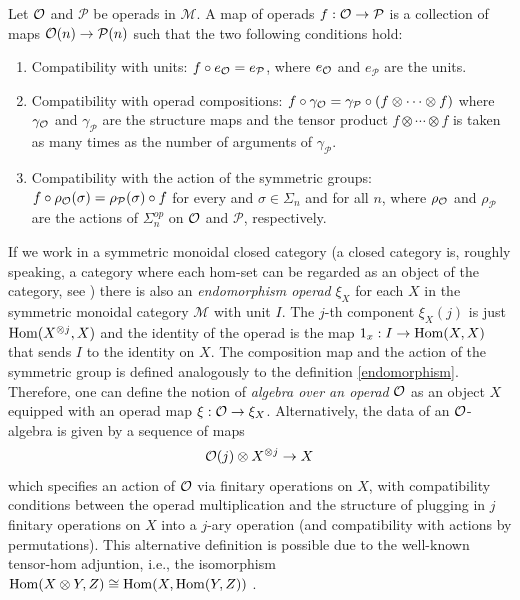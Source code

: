 \documentclass[TFM.tex]{subfiles}
\begin{document}
\begin{defi}
Let ${\mathcal O}$ and $\mathcal{P}$ be operads in $\mathscr{M}$. A map of operads $f:{\mathcal O}\to \mathcal{P}$ is a collection of maps ${\mathcal O}(n)\to \mathcal{P}(n)$ such that the two following conditions hold:
\begin{enumerate}
\item Compatibility with units:  $f\circ e_{\mathcal O}=e_\mathcal{P}$, where $e_{\mathcal O}$ and $e_\mathcal{P}$ are the units.
\item Compatibility with operad compositions: $f\circ \gamma_{\mathcal O}=\gamma_\mathcal{P}\circ (f\otimes\cdots\otimes f)$ where $\gamma_{\mathcal O}$ and $\gamma_\mathcal{P}$ are the structure maps and the tensor product $f\otimes\cdots\otimes f$ is taken as many times as the number of arguments of $\gamma_\mathcal{P}$. 
\item  Compatibility with the action of the symmetric groups: $f\circ \rho_{\mathcal O}(\sigma)=\rho_\mathcal{P}(\sigma)\circ f$ for every and $\sigma\in\Sigma_n$ and for all $n$, where $\rho_{\mathcal O}$ and $\rho_\mathcal{P}$ are the actions of $\Sigma_n^{op}$ on ${\mathcal O}$ and $\mathcal{P}$, respectively.
\end{enumerate}
\end{defi}



If we work in a symmetric monoidal closed category (a closed category is, roughly speaking, a category where each hom-set can be regarded as an object of the category, see \cite[]{handbook}) there is also an \emph{endomorphism operad} $\xi_X$ for each $X$ in the symmetric monoidal category $\mathscr{M}$ with unit $I$. The $j$-th component $\xi_X(j)$ is just $\operatorname{Hom}(X^{\otimes j},X)$ and the identity of the operad is the map $1_x:I\to \operatorname{Hom}(X,X)$ that sends $I$ to the identity on $X$. The composition map and the action of the symmetric group is defined analogously to the definition \ref{endomorphism}. Therefore, one can define the notion of \emph{algebra over an operad} ${\mathcal O}$ as an object $X$ equipped with an operad map $\xi:{\mathcal O}\to\xi_X$. Alternatively, the data of an ${\mathcal O}$-algebra is given by a sequence of maps
\[
{\mathcal O}(j) \otimes X^{\otimes j} \to X
\]
which specifies an action of ${\mathcal O}$ via finitary operations on $X$, with compatibility conditions between the operad multiplication and the structure of plugging in $j$ finitary operations on $X$ into a $j$-ary operation (and compatibility with actions by permutations). This alternative definition is possible due to the well-known tensor-hom adjuntion, i.e., the isomorphism $\operatorname{Hom}(X\otimes Y,Z)\cong \operatorname{Hom}(X,\operatorname{Hom}(Y,Z))$ \cite{tensor-hom}. 
\end{document}
